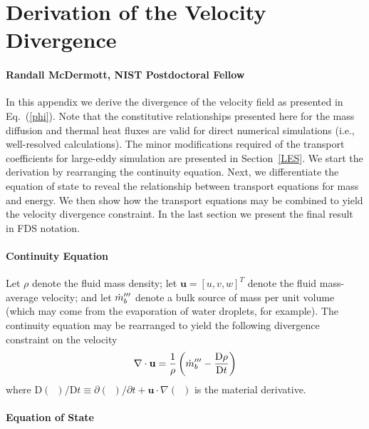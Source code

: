 \documentclass[11pt]{book}
\begin{document}
\chapter{Derivation of the Velocity Divergence}

\subsubsection{Randall McDermott, NIST Postdoctoral Fellow}

In this appendix we derive the divergence of the velocity field as presented in Eq.~(\ref{phi}).
Note that the constitutive relationships presented here for the mass diffusion and thermal heat fluxes are valid for direct numerical simulations (i.e., well-resolved calculations).
The minor modifications required of the transport coefficients for large-eddy simulation are presented in Section~\ref{LES}.  We start the derivation by rearranging the continuity equation.
Next, we differentiate the equation of state to reveal the relationship between transport equations for mass and energy.
We then show how the transport equations may be combined to yield the velocity divergence constraint.  In the last section we present the final result in FDS notation.

\subsubsection{Continuity Equation}
\label{continuity}

Let $\rho$ denote the fluid mass density; let $\mathbf{u} = [u,v,w]^T$ denote the fluid mass-average velocity; and let $\dot{m}_b^{{\prime\prime\prime}}$
denote a bulk source of mass per unit volume (which may come from the evaporation of water droplets, for example).
The continuity equation may be rearranged to yield the following divergence constraint on the velocity
\begin{equation}
\label{eqn_divconstraint1}
\nabla\cdot \mathbf{u} = \frac{1}{\rho} \left( \dot{m}_b^{{\prime\prime\prime}} -  \frac{\mbox{D} \rho}{\mbox{D} t} \right)
\end{equation}
where $\mbox{D}(\,\,\,)/\mbox{D} t \equiv \partial (\,\,\,)/\partial t + \mathbf{u}\cdot\nabla(\,\,\,)$ is the material derivative.

\subsubsection{Equation of State}
\label{EOS}
\end{document}

